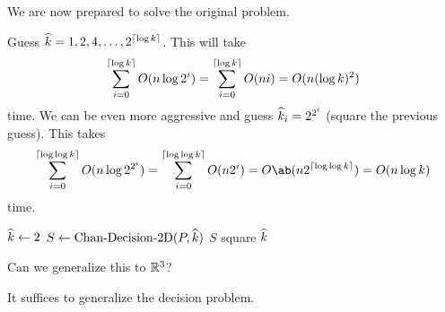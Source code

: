 We are now prepared to solve the original problem.
\begin{solution}
    Guess $\widehat{k} = 1, 2, 4, \ldots, 2^{\lceil\log k\rceil}$.
    This will take \[
        \sum_{i=0}^{\lceil\log k\rceil} O(n \log 2^i)
            = \sum_{i=0}^{\lceil\log k\rceil} O(n i)
            = O(n (\log k)^2)
    \] time.
    We can be even more aggressive and guess
    $\widehat{k}_i = 2^{2^i}$ (square the previous guess).
    This takes \[
        \sum_{i=0}^{\ceil{\log \log k}} O(n \log 2^{2^i})
            = \sum_{i=0}^{\ceil{\log \log k}} O(n 2^i)
            = O\ab(n 2^{\ceil{\log \log k}})
            = O(n \log k)
    \] time.
    \begin{algo}
            \State $\widehat{k} \gets 2$
                \State $S \gets\operatorname{Chan-Decision-2D}(P, \widehat{k})$
                    \State \Return $S$
                \EndIf
                \State square $\widehat{k}$
            \EndFor
        \EndFn
    \end{algo}
\end{solution}

\begin{question*}
    Can we generalize this to $\mathbb{R}^3$?
\end{question*}
It suffices to generalize the decision problem.

